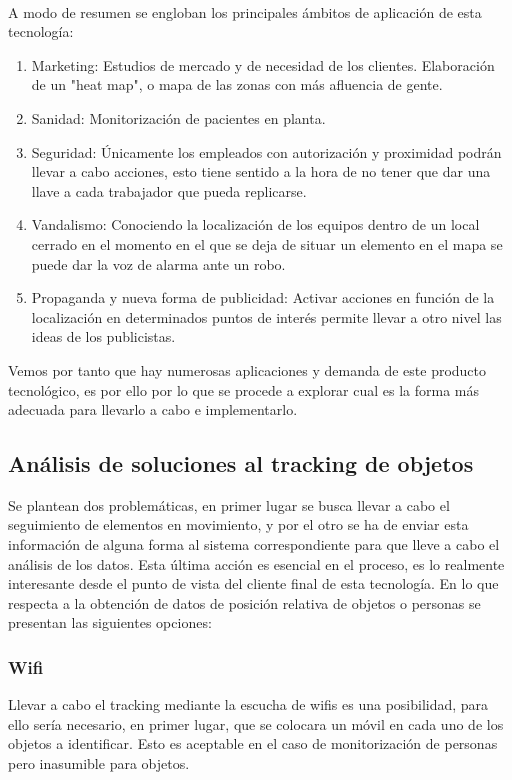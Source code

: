 \documentclass[paper=a4, fontsize=11pt,twoside]{scrartcl}	%
\begin{document}
        \paragraph{}
        A modo de resumen se engloban los principales ámbitos de aplicación de esta tecnología:
        \begin{enumerate}
            \item Marketing: Estudios de mercado y de necesidad de los clientes. Elaboración de un "heat map", o mapa 
            de las zonas con más afluencia de gente.
            \item Sanidad: Monitorización de pacientes en planta. 
            \item Seguridad: Únicamente los empleados con autorización y proximidad podrán llevar a cabo acciones,
            esto tiene sentido a la hora de no tener que dar una llave a cada trabajador que pueda replicarse.
            \item Vandalismo: Conociendo la localización de los equipos dentro de un local cerrado en el momento 
            en el que se deja de situar un elemento en el mapa se puede dar la voz de alarma ante un robo.
            \item Propaganda y nueva forma de publicidad: Activar acciones en función de la localización en determinados
            puntos de interés permite llevar a otro nivel las ideas de los publicistas.
        \end{enumerate}
        Vemos por tanto que hay numerosas aplicaciones y demanda de este producto tecnológico, es por ello por lo que se 
        procede a explorar cual es la forma más adecuada para llevarlo a cabo e implementarlo.
    \subsection{Análisis de soluciones al tracking de objetos}
        Se plantean dos problemáticas, en primer lugar se busca llevar a cabo el seguimiento de elementos en movimiento, y por el otro 
        se ha de enviar esta información de alguna forma al sistema correspondiente para que lleve a cabo el análisis de los datos. Esta
        última acción es esencial en el proceso, es lo realmente interesante desde el punto de vista del cliente final de esta tecnología.
        En lo que respecta a la obtención de datos de posición relativa de objetos o personas se presentan las siguientes opciones:
        \subsubsection {Wifi}
            Llevar a cabo el tracking mediante la escucha de wifis es una posibilidad, para ello sería
            necesario, en primer lugar, que se colocara un móvil en cada uno de los objetos a identificar. Esto es aceptable 
            en el caso de monitorización de personas pero inasumible para objetos.
\end{document}
